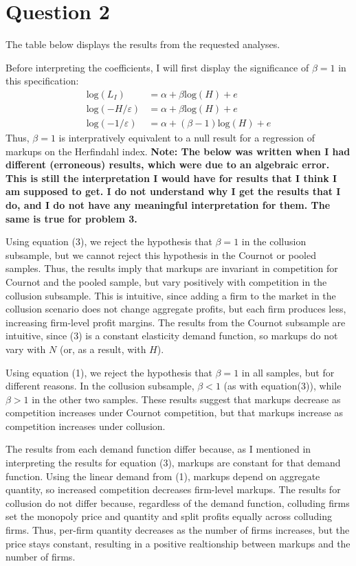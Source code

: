 \documentclass{article}
\newcommand{\loge}[1]{\text{log}\left(#1\right)}
\begin{document}
\pagebreak 
\section*{Question 2}
The table below displays the results from the requested analyses.
\begin{center}
  
\end{center}
Before interpreting the coefficients, I will first display the significance of ${\beta=1}$ in this specification:\begin{align*} 
  \loge{L_I} &= \alpha + \beta\loge{H} + e \\
  \loge{-H/\varepsilon} &= \alpha + \beta\loge{H} + e \\
  \loge{-1/\varepsilon} &= \alpha + (\beta-1)\loge{H} + e 
\end{align*}
Thus, ${\beta=1}$ is interpratively equivalent to a null result for a regression of markups on the Herfindahl index. \textbf{Note: The below was written when I had different (erroneous) results, which were due to an algebraic error. This is still the interpretation I would have for results that I think I am supposed to get. I do not understand why I get the results that I do, and I do not have any meaningful interpretation for them. The same is true for problem 3.}

Using equation (3), we reject the hypothesis that ${\beta=1}$ in the collusion subsample, but we cannot reject this hypothesis in the Cournot or pooled samples. Thus, the results imply that markups are invariant in competition for Cournot and the pooled sample, but vary positively with competition in the collusion subsample. This is intuitive, since adding a firm to the market in the collusion scenario does not change aggregate profits, but each firm produces less, increasing firm-level profit margins. The results from the Cournot subsample are intuitive, since (3) is a constant elasticity demand function, so markups do not vary with $N$ (or, as a result, with $H$).

Using equation (1), we reject the hypothesis that ${\beta=1}$ in all samples, but for different reasons. In the collusion subsample, ${\beta<1}$ (as with equation(3)), while ${\beta>1}$ in the other two samples. These results suggest that markups decrease as competition increases under Cournot competition, but that markups increase as competition increases under collusion.

The results from each demand function differ because, as I mentioned in interpreting the results for equation (3), markups are constant for that demand function. Using the linear demand from (1), markups depend on aggregate quantity, so increased competition decreases firm-level markups. The results for collusion do not differ because, regardless of the demand function, colluding firms set the monopoly price and quantity and split profits equally across colluding firms. Thus, per-firm quantity decreases as the number of firms increases, but the price stays constant, resulting in a positive realtionship between markups and the number of firms.
\end{document}
